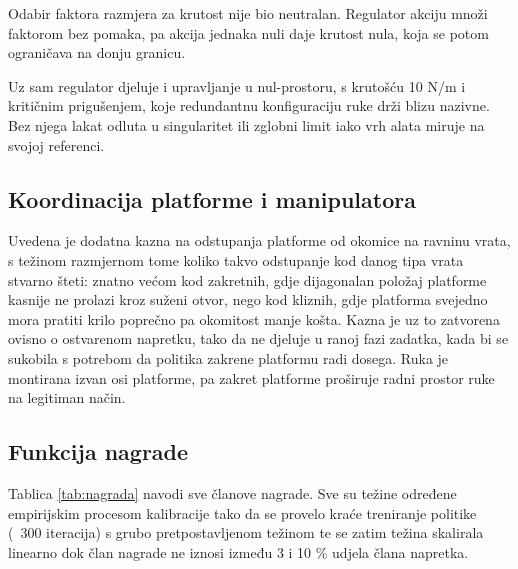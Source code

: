 Odabir faktora razmjera za krutost nije bio neutralan. Regulator akciju množi faktorom bez
pomaka, pa akcija jednaka nuli daje krutost nula, koja se potom ograničava na donju granicu.

Uz sam regulator djeluje i upravljanje u nul-prostoru, s krutošću 10 N/m i kritičnim
prigušenjem, koje redundantnu konfiguraciju ruke drži blizu nazivne. Bez njega lakat odluta u
singularitet ili zglobni limit iako vrh alata miruje na svojoj referenci.

\subsection{Koordinacija platforme i manipulatora}
\label{sec:baza-uci}

Uvedena je dodatna kazna na odstupanja platforme od okomice na
ravninu vrata, s težinom razmjernom tome koliko takvo odstupanje kod danog tipa vrata stvarno
šteti: znatno većom kod zakretnih, gdje dijagonalan položaj platforme kasnije ne prolazi kroz
suženi otvor, nego kod kliznih, gdje platforma svejedno mora pratiti krilo poprečno pa okomitost
manje košta. Kazna je uz to zatvorena ovisno o ostvarenom napretku, tako da ne djeluje u ranoj
fazi zadatka, kada bi se sukobila s potrebom da politika zakrene platformu radi dosega. Ruka
je montirana izvan osi platforme, pa zakret platforme proširuje radni prostor ruke na legitiman način.

\subsection{Funkcija nagrade}
\label{sec:nagrada}

Tablica \ref{tab:nagrada} navodi sve članove nagrade. Sve su težine određene empirijskim procesom
kalibracije tako da se provelo kraće treniranje politike (~300 iteracija) s grubo pretpostavljenom
težinom te se zatim težina skalirala linearno dok član nagrade ne iznosi između 3 i 10 \% udjela
člana napretka.

